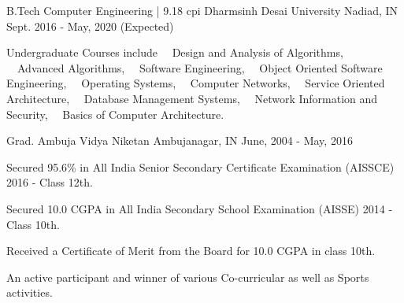 


\begin{cventries}

\cventry
{B.Tech Computer Engineering | 9.18 cpi} %
{Dharmsinh Desai University} %
{Nadiad, IN} %
{Sept. 2016 - May, 2020 (Expected)} %
{ %
\begin{cvitems}
\item {Undergraduate Courses include ~~Design and Analysis of Algorithms, ~~Advanced Algorithms, ~~Software Engineering, ~~Object Oriented Software Engineering, ~~Operating Systems, ~~Computer Networks, ~~Service Oriented Architecture,  ~~Database Management Systems, ~~Network Information and Security, ~~Basics of Computer Architecture.}
\end{cvitems}
}




\cventry
{Grad.} %
{Ambuja Vidya Niketan} %
{Ambujanagar, IN} %
{June, 2004 - May, 2016} %
{ %
\begin{cvitems}
\item {Secured 95.6\% in All India Senior Secondary Certificate Examination (AISSCE) 2016 - Class 12th.}
\item {Secured 10.0 CGPA in All India Secondary School Examination (AISSE) 2014 - Class 10th.}
\item {Received a Certificate of Merit from the Board for 10.0 CGPA in class 10th.}
\item {An active participant and winner of various Co-curricular as well as Sports activities.}
\end{cvitems}
}

\end{cventries}

